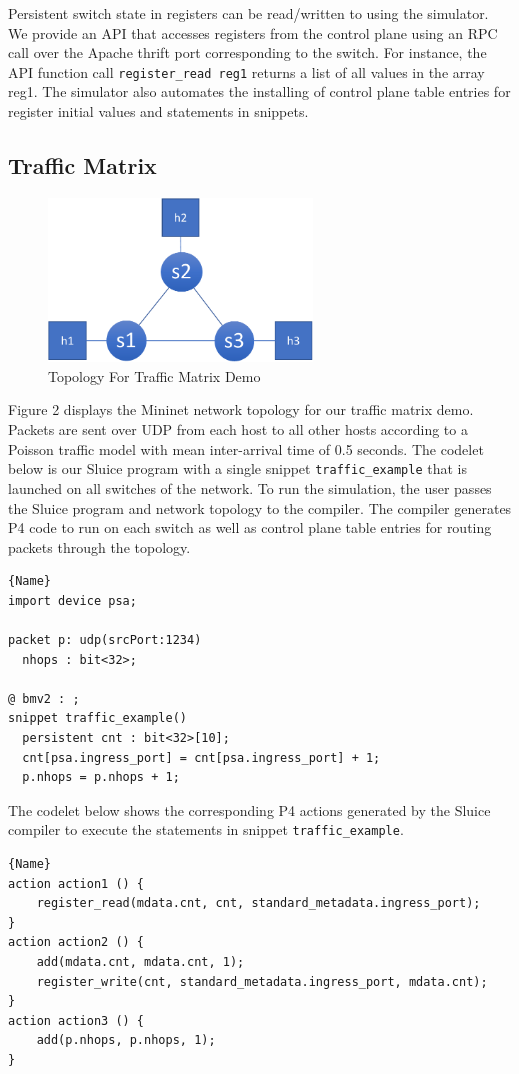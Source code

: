 \documentclass[12pt, oneside]{article}
\begin{document}
Persistent switch state in registers can be read/written to using the simulator. We provide an API that accesses registers from the control plane using an RPC call over the Apache thrift port corresponding to the switch. For instance, the API function call \texttt{register\_read reg1} returns a list of all values in the array reg1. The simulator also automates the installing of control plane table entries for register initial values and statements in snippets.
\subsection{Traffic Matrix}

\begin{figure}
\centering
\includegraphics[width=70mm,scale=0.7]{figures/traf_mat_topo}
\caption{Topology For Traffic Matrix Demo}
\end{figure}


Figure 2 displays the Mininet network topology for our traffic matrix demo.
Packets are sent over UDP from each host to all other hosts according to a
Poisson traffic model with mean inter-arrival time of 0.5 seconds. The codelet
below is our Sluice program with a single snippet \texttt{traffic\_example}
that is launched on all switches of the network. To run the simulation, the
user passes the Sluice program and network topology to the compiler. The
compiler generates P4 code to run on each switch as well as control plane table
entries for routing packets through the topology.  

\begin{lstlisting}[caption=Sluice Traffic\_Example, frame=tlrb, basicstyle=\linespread{1.3}\scriptsize]{Name}
import device psa;

packet p: udp(srcPort:1234)
  nhops : bit<32>;

@ bmv2 : ;
snippet traffic_example()
  persistent cnt : bit<32>[10];
  cnt[psa.ingress_port] = cnt[psa.ingress_port] + 1;
  p.nhops = p.nhops + 1;
\end{lstlisting}
The codelet below shows the corresponding P4 actions generated by the Sluice compiler to execute the statements in snippet \texttt{traffic\_example}.
\begin{lstlisting}[caption=P4 Actions For Traffic\_Example,frame=tlrb, basicstyle=\linespread{1.3}\scriptsize]{Name}
action action1 () {
    register_read(mdata.cnt, cnt, standard_metadata.ingress_port);
}
action action2 () {
    add(mdata.cnt, mdata.cnt, 1);
    register_write(cnt, standard_metadata.ingress_port, mdata.cnt);
}
action action3 () {
    add(p.nhops, p.nhops, 1);
}
\end{lstlisting}
\end{document}
